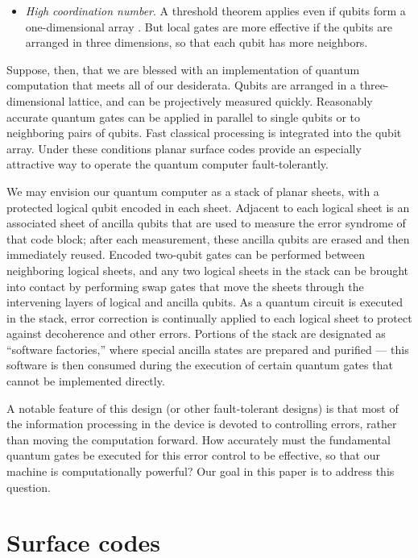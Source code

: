 \begin{itemize}
\item {\em High coordination number}. A threshold theorem applies even if qubits form a one-dimensional array \cite{ben-or,gottesman_local}. But local gates are more effective if the qubits are arranged in three dimensions, so that each qubit has more neighbors.
\end{itemize}

Suppose, then, that we are blessed with an implementation of quantum computation that meets all of our desiderata. Qubits are arranged in a three-dimensional lattice, and can be projectively measured quickly. Reasonably accurate quantum gates can be applied in parallel to single qubits or to neighboring pairs of qubits. Fast classical processing is integrated into the qubit array. Under these conditions planar surface codes provide an especially attractive way to operate the quantum computer fault-tolerantly.

We may envision our quantum computer as a stack of planar sheets, with a protected logical qubit encoded in each sheet. Adjacent to each logical sheet is an associated sheet of ancilla qubits that are used to measure the error syndrome of that code block; after each measurement, these ancilla qubits are erased and then immediately reused. Encoded two-qubit gates can be performed between neighboring logical sheets, and any two logical sheets in the stack can be brought into contact by performing swap gates that move the sheets through the intervening layers of logical and ancilla qubits. As a quantum circuit is executed in the stack, error correction is continually applied to each logical sheet to protect against decoherence and other errors. Portions of the stack are designated as ``software factories,'' where special ancilla states are prepared and purified --- this software is then consumed during the execution of certain quantum gates that cannot be implemented directly. 

A notable feature of this design (or other fault-tolerant designs) is that most of the information processing in the device is devoted to controlling errors, rather than moving the computation forward. How accurately must the fundamental quantum gates be executed for this error control to be effective, so that our machine is computationally powerful? Our goal in this paper is to address this question.

\section{Surface codes}
\label{sec:surface}

